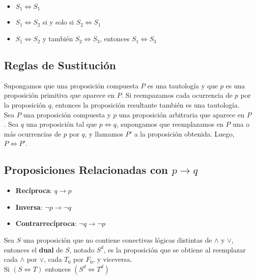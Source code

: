 \documentclass[11pt,a4paper]{article}
\begin{document}
\begin{itemize}
\item $S_1 \Leftrightarrow S_1$
\item $S_1 \Leftrightarrow S_2$ si y solo si $S_2 \Leftrightarrow S_1$
\item $S_1 \Leftrightarrow S_2$ y tambi\'en $S_2 \Leftrightarrow S_3$, entonces $S_1 \Leftrightarrow S_3$
\end{itemize}

\subsection{Reglas de Sustituci\'on}
\noindent Supongamos que una proposici\'on compuesta $P$ es una tautolog\'ia y que $p$ es una proposici\'on primitiva que aparece en $P$. Si reempazamos cada ocurrencia de $p$ por la proposici\'on $q$, entonces la proposici\'on resultante tambi\'en es una tautolog\'ia.\\
\noindent Sea $P$ una proposici\'on compuesta y $p$ una proposici\'on arbitraria que aparece en $P$. Sea $q$ una proposici\'on tal que $p \Leftrightarrow q$, supongamos que reemplazamos en $P$ una o m\'as ocurrencias de $p$ por $q$, y llamamos $P'$ a la proposici\'on obtenida. Luego, $P \Leftrightarrow P'$.

\subsection{Proposiciones Relacionadas con $p \rightarrow q$}
\begin{multicols}{3}
\begin{itemize}[leftmargin=*]
\item \textbf{Rec\'iproca}: $q \rightarrow p$
\item \textbf{Inversa}: $\lnot p \rightarrow \lnot q$
\item \textbf{Contrarrecíproca}: $\lnot q \rightarrow \lnot p$
\end{itemize}
\end{multicols}

\noindent Sea $S$ una proposici\'on que no contiene conectivas l\'ogicas distintas de $\land$ y $\lor$, entonces el \textbf{dual} de $S$, notado $S^d$, es la proposici\'on que se obtiene al reemplazar cada $\land$ por $\lor$, cada $T_0$ por $F_0$, y viceversa.\\
\indent \indent \indent \indent \indent \indent \indent \indent \indent \indent \indent $\text{Si } (S \Leftrightarrow T)$ entonces $(S^d \Leftrightarrow T^d)$
\end{document}
